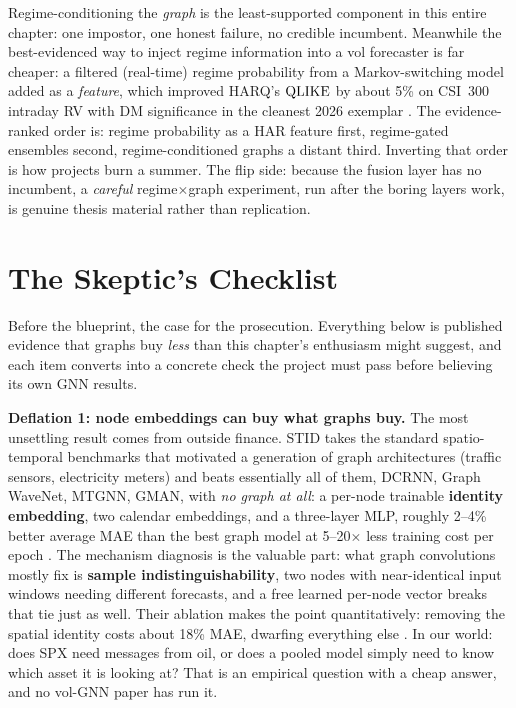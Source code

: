 \begin{keyidea}
Regime-conditioning the \emph{graph} is the least-supported component in this entire chapter: one impostor, one honest failure, no credible incumbent. Meanwhile the best-evidenced way to inject regime information into a vol forecaster is far cheaper: a filtered (real-time) regime probability from a Markov-switching model added as a \emph{feature}, which improved HARQ's $\operatorname{QLIKE}$ by about 5\% on CSI~300 intraday RV with DM significance in the cleanest 2026 exemplar \citep[Tables~2--4]{FangSlepaczuk2026}. The evidence-ranked order is: regime probability as a HAR feature first, regime-gated ensembles second, regime-conditioned graphs a distant third. Inverting that order is how projects burn a summer. The flip side: because the fusion layer has no incumbent, a \emph{careful} regime$\times$graph experiment, run after the boring layers work, is genuine thesis material rather than replication.
\end{keyidea}

\section{The Skeptic's Checklist}\label{sec:gnn:skeptic}

Before the blueprint, the case for the prosecution. Everything below is published evidence that graphs buy \emph{less} than this chapter's enthusiasm might suggest, and each item converts into a concrete check the project must pass before believing its own GNN results.

\textbf{Deflation 1: node embeddings can buy what graphs buy.} The most unsettling result comes from outside finance. STID \citep{ShaoZhangWang2022} takes the standard spatio-temporal benchmarks that motivated a generation of graph architectures (traffic sensors, electricity meters) and beats essentially all of them, DCRNN, Graph WaveNet, MTGNN, GMAN, with \emph{no graph at all}: a per-node trainable \textbf{identity embedding}, two calendar embeddings, and a three-layer MLP, roughly 2--4\% better average MAE than the best graph model at 5--20$\times$ less training cost per epoch \citep[Tables~2--3]{ShaoZhangWang2022}. The mechanism diagnosis is the valuable part: what graph convolutions mostly fix is \textbf{sample indistinguishability}, two nodes with near-identical input windows needing different forecasts, and a free learned per-node vector breaks that tie just as well. Their ablation makes the point quantitatively: removing the spatial identity costs about 18\% MAE, dwarfing everything else \citep[Fig.~3]{ShaoZhangWang2022}. In our world: does SPX need messages from oil, or does a pooled model simply need to know which asset it is looking at? That is an empirical question with a cheap answer, and no vol-GNN paper has run it.

